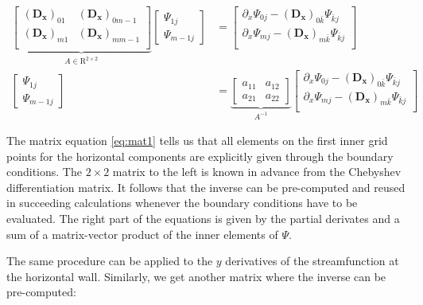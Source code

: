 \begin{align}
\underbrace{\begin{bmatrix} (\mathbf{D_x})_{01} & (\mathbf{D_x})_{0m-1} \\
    (\mathbf{D_x})_{m1} & (\mathbf{D_x})_{mm-1} \\
\end{bmatrix}}_{A \in \mathrm{R}^{2 \times 2}}
\begin{bmatrix} \Psi_{1j} \\ \Psi_{m-1j}
\end{bmatrix} &=
\begin{bmatrix}
\partial_x\Psi_{0j} - (\mathbf{D_x})_{0\bar{k}}\Psi_{\bar{k}j} \\
\partial_x\Psi_{mj} - (\mathbf{D_x})_{m\bar{k}}\Psi_{\bar{k}j} \\
\end{bmatrix} \nonumber \\
\begin{bmatrix} \Psi_{1j} \\ \Psi_{m-1j}
\end{bmatrix} &=
\underbrace{\begin{bmatrix} a_{11} & a_{12} \\ a_{21} & a_{22} 
\end{bmatrix}}_{A^{-1}}
\begin{bmatrix}
\partial_x\Psi_{0j} - (\mathbf{D_x})_{0\bar{k}}\Psi_{\bar{k}j} \\
\partial_x\Psi_{mj} - (\mathbf{D_x})_{m\bar{k}}\Psi_{\bar{k}j} \\
\end{bmatrix}
\label{eq:mat1}
\end{align}

The matrix equation \eqref{eq:mat1} tells us that all elements on the first
inner grid points for the horizontal components are explicitly given through
the boundary conditions. The $2 \times 2$ matrix to the left is known in
advance from the Chebyshev differentiation matrix. It follows that the inverse
can be pre-computed and reused in succeeding calculations whenever the boundary
conditions have to be evaluated. The right part of the equations is given by
the partial derivates and a sum of a matrix-vector product of the inner
elements of $\Psi$.

The same procedure can be applied to the $y$ derivatives of the streamfunction
at the horizontal wall. Similarly, we get another matrix where the inverse can
be pre-computed:

